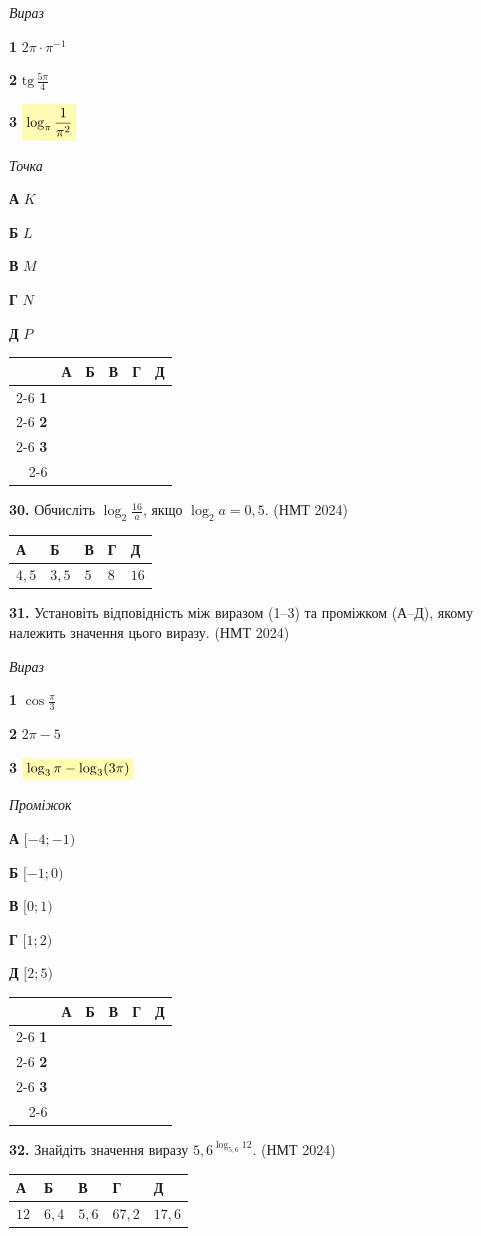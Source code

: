 \documentclass[14pt]{extarticle}
\newcommand{\answerGrid}{
    \begingroup
    \renewcommand{\arraystretch}{1.3} 
    \setlength{\tabcolsep}{7pt} 
    \begin{tabular}{r|c|c|c|c|c|}
         \multicolumn{1}{c}{} & \multicolumn{1}{c}{\textbf{А}} & \multicolumn{1}{c}{\textbf{Б}} & \multicolumn{1}{c}{\textbf{В}} & \multicolumn{1}{c}{\textbf{Г}} & \multicolumn{1}{c}{\textbf{Д}} \\ \cline{2-6}
         \textbf{1} & & & & & \\ \cline{2-6}
         \textbf{2} & & & & & \\ \cline{2-6}
         \textbf{3} & & & & & \\ \cline{2-6}
    \end{tabular}
    \endgroup
}
\newcommand{\matchingLayout}[3]{
    \noindent
    \begin{minipage}[t]{0.40\textwidth}
        #1
    \end{minipage}%
    \hfill
    \begin{minipage}[t]{0.28\textwidth}
        #2
    \end{minipage}%
    \hfill
    \begin{minipage}[t]{0.30\textwidth}
        \vspace{0pt}
        \begin{flushright}
        #3
        \end{flushright}
    \end{minipage}
}
\newcommand{\answerTable}[5]{
\begin{center}
\begin{tabular}{|*{5}{>{\centering\arraybackslash}m{2.8cm}|}}
\hline
\rule[-0.3cm]{0pt}{0.8cm}\textbf{А} & \textbf{Б} & \textbf{В} & \textbf{Г} & \textbf{Д} \\
\hline
\rule[-0.4cm]{0pt}{1.0cm}#1 & \rule[-0.4cm]{0pt}{1.0cm}#2 & \rule[-0.4cm]{0pt}{1.0cm}#3 & \rule[-0.4cm]{0pt}{1.0cm}#4 & \rule[-0.4cm]{0pt}{1.0cm}#5 \\
\hline
\end{tabular}
\end{center}
}
\newcommand{\nmtyear}[1]{\hfill{\small\color{yearcolor}(НМТ #1)}}
\begin{document}
\vspace{0.3cm}

\matchingLayout{\textit{Вираз}

\textbf{1} \quad $2\pi \cdot \pi^{-1}$

\textbf{2} \quad $\mathrm{tg}\,\displaystyle\frac{5\pi}{4}$

\textbf{3} \quad $\colorbox{yellow!30}{$\log_\pi \dfrac{1}{\pi^2}$}$
}{
\textit{Точка}

\textbf{А} \quad $K$

\textbf{Б} \quad $L$

\textbf{В} \quad $M$

\textbf{Г} \quad $N$

\textbf{Д} \quad $P$
}{
\answerGrid
}

\vspace{0.8cm}

\noindent\textbf{30.} Обчисліть $\log_2 \displaystyle\frac{16}{a}$, якщо $\log_2 a = 0{,}5$. \nmtyear{2024}
\vspace{0.3cm}

\answerTable{$4{,}5$}{$3{,}5$}{$5$}{$8$}{$16$}

\vspace{0.5cm}

\noindent\textbf{31.} Установіть відповідність між виразом (1--3) та проміжком (А--Д), якому належить значення цього виразу. \nmtyear{2024}
\vspace{0.3cm}

\matchingLayout{\textit{Вираз}

\textbf{1} \quad $\cos \displaystyle\frac{\pi}{3}$

\textbf{2} \quad $2\pi - 5$

\textbf{3} \quad $\colorbox{yellow!30}{$\log_3 \pi - \log_3 (3\pi)$}$
}{
\textit{Проміжок}

\textbf{А} \quad $[-4; -1)$

\textbf{Б} \quad $[-1; 0)$

\textbf{В} \quad $[0; 1)$

\textbf{Г} \quad $[1; 2)$

\textbf{Д} \quad $[2; 5)$
}{
\answerGrid
}

\vspace{0.8cm}

\noindent\textbf{32.} Знайдіть значення виразу $5{,}6^{\log_{5,6} 12}$. \nmtyear{2024}
\vspace{0.3cm}

\answerTable{$12$}{$6{,}4$}{$5{,}6$}{$67{,}2$}{$17{,}6$}
\end{document}
